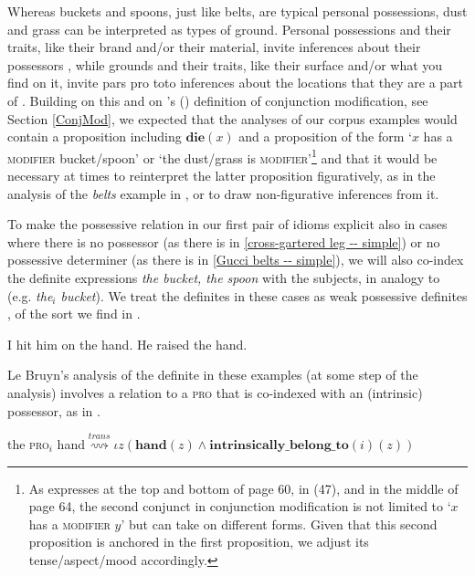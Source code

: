\documentclass[output=paper]{langsci/langscibook}
\begin{document}
\noindent Whereas buckets and spoons, just like belts, are typical personal possessions, dust and grass can be interpreted as types of ground. Personal possessions and their traits, like their brand and/or their material, invite inferences about their possessors \citep[see, e.g.\@,][]{Belk88}, while grounds and their traits, like their surface and/or what you find on it, invite pars pro toto inferences about the locations that they are a part of \citep[for a somewhat similar reasoning based on conceptual contiguity, see][92]{stathi07}. Building on this and on \citeauthor{ernst81}'s (\citeyear{ernst81}) definition of conjunction modification, see Section \ref{ConjMod}, we expected that the analyses of our corpus examples would contain a proposition including $\textbf{die}(x)$ and a proposition of the form `$x$ has a \textsc{modifier} bucket/spoon' or `the dust/grass is \textsc{modifier}'\footnote{As \citet{ernst81} expresses at the top and bottom of page 60, in (47), and in the middle of page 64, the second conjunct in conjunction modification is not limited to `$x$ has a \textsc{modifier} $y$' but can take on different forms. Given that this second proposition is anchored in the first proposition, we adjust its tense/aspect/mood accordingly.} and that it would be necessary at times to reinterpret the latter proposition figuratively, as in the analysis of the \underline{} \textit{belts} example in , or to draw non-figurative inferences from it.

To make the possessive relation in our first pair of idioms explicit also in cases where there is no possessor (as there is in \ref{cross-gartered leg -- simple}) or no possessive determiner (as there is in \ref{Gucci belts -- simple}), we will also co-index the definite expressions \textit{the bucket, the spoon} with the subjects, in analogy to  (e.g. \textit{the$_i$ bucket}). We treat the definites in these cases as weak possessive definites \citep[in the sense of][]{poesio94, barker05}, of the sort we find in  \citep[from][]{lebruyn14}.

\ea\label{weakdef}
\ea
I hit him on the hand.
\ex	
He raised the hand.
\z
\z

\noindent Le Bruyn's analysis of the definite in these examples (at some step of the analysis) involves a relation to a \textsc{pro} that is co-indexed with an (intrinsic) possessor, as in  \citep[adapted from][324]{lebruyn14}.

\ea	the \textsc{pro}$_i$ hand\quad $\stackrel{trans}{\rightsquigarrow}$\quad $\iota z (\textbf{hand}(z) \wedge \textbf{intrinsically\_belong\_to}(i)(z))$\label{thehand}
\z
\end{document}
